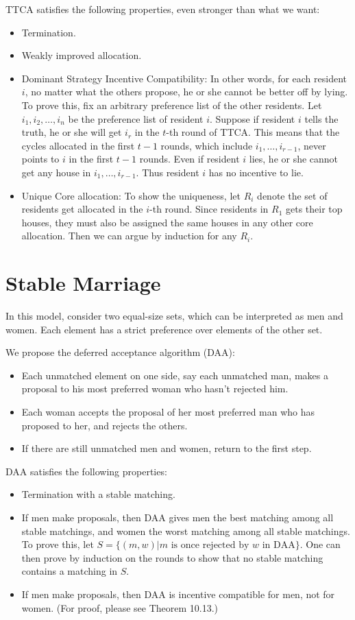 \documentclass[openany]{book}
\theoremstyle{remark}
\begin{document}
TTCA satisfies the following properties, even stronger than what we want:
\begin{itemize}
    \item Termination.
    \item Weakly improved allocation.
    \item Dominant Strategy Incentive Compatibility: In other words, for each resident $i$, no matter what the others propose, he or she cannot be better off by lying. To prove this, fix an arbitrary preference list of the other residents. Let $i_1,i_2,\ldots,i_n$ be the preference list of resident $i$. Suppose if resident $i$ tells the truth, he or she will get $i_r$ in the $t$-th round of TTCA. This means that the cycles allocated in the first $t-1$ rounds, which include $i_1,\ldots,i_{r-1}$, never points to $i$ in the first $t-1$ rounds. Even if resident $i$ lies, he or she cannot get any house in $i_1,\ldots,i_{r-1}$. Thus resident $i$ has no incentive to lie.
    \item Unique Core allocation: To show the uniqueness, let $R_i$ denote the set of residents get allocated in the $i$-th round. Since residents in $R_1$ gets their top houses, they must also be assigned the same houses in any other core allocation. Then we can argue by induction for any $R_i$.
\end{itemize}

\section{Stable Marriage}
In this model, consider two equal-size sets, which can be interpreted as men and women. Each element has a strict preference over elements of the other set.

We propose the deferred acceptance algorithm (DAA):
\begin{itemize}
    \item Each unmatched element on one side, say each unmatched man, makes a proposal to his most preferred woman who hasn't rejected him.
    \item Each woman accepts the proposal of her most preferred man who has proposed to her, and rejects the others.
    \item If there are still unmatched men and women, return to the first step.
\end{itemize}

DAA satisfies the following properties:
\begin{itemize}
    \item Termination with a stable matching.
    \item If men make proposals, then DAA gives men the best matching among all stable matchings, and women the worst matching among all stable matchings. To prove this, let $S=\{(m,w)|m\textrm{ is once rejected by }w\textrm{ in DAA}\}$. One can then prove by induction on the rounds to show that no stable matching contains a matching in $S$.
    \item If men make proposals, then DAA is incentive compatible for men, not for women. (For proof, please see \cite{NRTV07} Theorem 10.13.)
\end{itemize}
\end{document}
